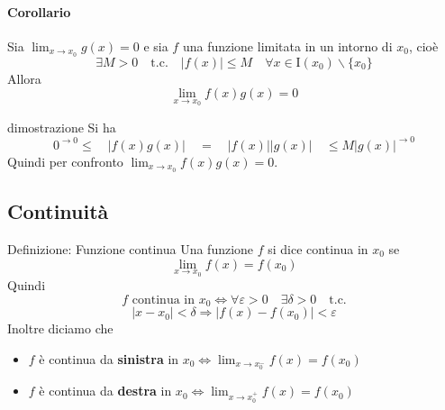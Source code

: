 \documentclass[x11names]{article}
\begin{document}
	\paragraph{Corollario} Sia $\lim_{x \to x_0}g(x) = 0$ e sia $f$ una funzione limitata in un intorno di $x_0$, cioè
	\[
	\exists M > 0 \quad \text{t.c.} \quad |f(x)| \leq M \quad \forall x \in \text{I}(x_0) \backslash \{x_0\}
	\]
	Allora
	\[
	\lim_{x \to x_0}f(x)g(x) = 0
	\]
	
	\begin{es}{dimostrazione}
		Si ha 
		\[
		0^{\to 0} \leq  \quad |f(x)g(x)| \quad = \quad |f(x)| |g(x)|\quad  \leq M|g(x)|^{\to 0}
		\]
		Quindi per confronto $\lim_{x \to x_0}f(x)g(x) = 0$.
	\end{es}
	\subsection{Continuità}
		\begin{center}
		\colorbox{myblue}{\begin{minipage}{5.75in}
				\begin{blues}{Definizione: Funzione continua}
					Una funzione $f$ si dice continua in $x_0$ se 
					\[
					\lim_{x \to x_0} f(x)= f(x_{0})
					\]
					Quindi 
					\[
					f \text{ continua in } x_0 \Longleftrightarrow \forall \varepsilon > 0 \quad \exists \delta >0 \quad \text{t.c.}
					\]
					\[
					|x-x_0| < \delta \Longrightarrow |f(x) - f(x_0)| < \varepsilon
					\]
					Inoltre diciamo che
					\begin{itemize}
						\item $f$ è continua da \textbf{sinistra} in $x_0 \Longleftrightarrow \lim_{x \to x_0^-}f(x) = f(x_0)$
						\item $f$ è continua da \textbf{destra} in $x_0 \Longleftrightarrow \lim_{x \to x_0^+}f(x) = f(x_0)$
					\end{itemize}
				\end{blues}
		\end{minipage}}       
	\end{center}
	
\end{document}
